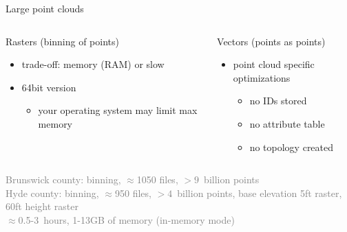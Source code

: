 \documentclass[xcolor={dvipsnames,usenames},beamer,aspectratio=169]{beamer}
\begin{document}
\begin{frame}{Large point clouds}

\begin{columns}
\begin{column}{0.44\textwidth}

Rasters (binning of points)

\begin{itemize}
  \item trade-off: memory (RAM) or slow
  \item 64bit version
  \begin{itemize}
  \item \tiny your operating system may limit max memory
  \end{itemize}
\end{itemize}

\vspace{2.2ex}

\end{column}
\begin{column}{0.44\textwidth}

Vectors (points as points)

\begin{itemize}
  \item point cloud specific optimizations
  \begin{itemize}
  \item no IDs stored
  \item no attribute table
  \item no topology created
  \end{itemize}
\end{itemize}

\end{column}
\end{columns}

\begin{columns}
\begin{column}{0.44\textwidth}

\textcolor{gray}{
\footnotesize
Brunswick county: binning, $\approx$1050 files, $>9$~billion points %
\\
Hyde county: binning, $\approx$950 files, $>4$~billion points, base elevation 5ft raster, 60ft height raster %
\\
$\approx$0.5-3~hours, 1-13GB of memory \tiny (in-memory mode)
}


\end{column}
\end{columns}
\end{frame}
\end{document}
